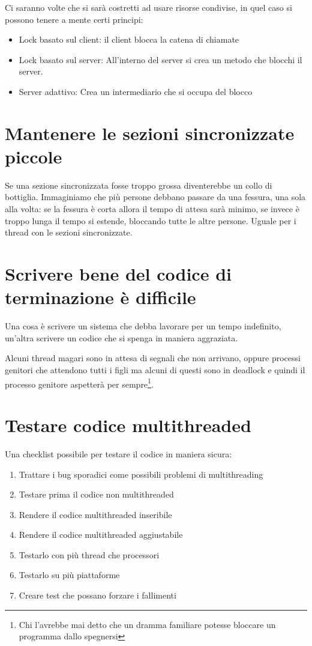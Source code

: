 \documentclass[11pt,a4paper]{book}
\begin{document}
Ci saranno volte che si sarà costretti ad usare risorse condivise, in quel caso si possono tenere a mente certi principi:
\begin{itemize}
	\item Lock basato sul client: il client blocca la catena di chiamate
	\item Lock basato sul server: All'interno del server si crea un metodo che blocchi il server.
	\item Server adattivo: Crea un intermediario che si occupa del blocco
\end{itemize}

\section{Mantenere le sezioni sincronizzate piccole}
Se una sezione sincronizzata fosse troppo grossa diventerebbe un collo di bottiglia. Immaginiamo che più persone debbano passare da una fessura, una sola alla volta: se la fessura è corta allora il tempo di attesa sarà minimo, se invece è troppo lunga il tempo si estende, bloccando tutte le altre persone. Uguale per i thread con le sezioni sincronizzate.

\section{Scrivere bene del codice di terminazione è difficile}
Una cosa è scrivere un sistema che debba lavorare per un tempo indefinito, un'altra scrivere un codice che si spenga in maniera aggraziata.

Alcuni thread magari sono in attesa di segnali che non arrivano, oppure processi genitori che attendono tutti i figli ma alcuni di questi sono in deadlock e quindi il processo genitore aspetterà per sempre\footnote{Chi l'avrebbe mai detto che un dramma familiare potesse bloccare un programma dallo spegnersi}.

\section{Testare codice multithreaded}
Una checklist possibile per testare il codice in maniera sicura:
\begin{enumerate}
	\item Trattare i bug sporadici come possibili problemi di multithreading
	\item Testare prima il codice non multithreaded
	\item Rendere il codice multithreaded inseribile
	\item Rendere il codice multithreaded aggiustabile
	\item Testarlo con più thread che processori
	\item Testarlo su più piattaforme
	\item Creare test che possano forzare i fallimenti
\end{enumerate}
\end{document}
